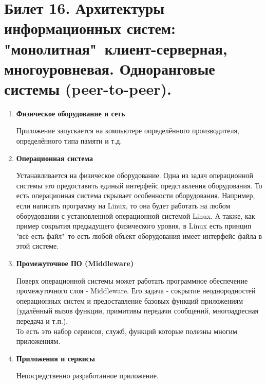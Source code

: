 \newpage
\section{Билет 16. Архитектуры информационных систем: "монолитная"\, клиент-серверная, многоуровневая. Одноранговые системы (peer-to-peer).}

\begin{enumerate}
\setlength\itemsep{0.0001em}
\item \textbf{Физическое оборудование и сеть}

Приложение запускается на компьютере определённого производителя, определённого типа памяти и т.д.

\item \textbf{Операционная система}

Устанавливается на физическое оборудование. Одна из задач операционной системы это предоставить единый интерфейс представления оборудования. То есть операционная система скрывает особенности оборудования. Например, если написать программу на Linux, то она будет работать на любом оборудовании с установленной операционной системой Linux. А также, как пример сокрытия предыдущего физического уровня, в Linux есть принцип "всё есть файл"\, то есть любой объект оборудования имеет интерфейс файла в этой системе. 

\item \textbf{Промежуточное ПО (Middleware)}

Поверх операционной системы может работать программное обеспечение промежуточного слоя - Middleware.
Его задача - сокрытие неоднородностей операционных систем и предоставление базовых функций приложениям (удалённый вызов функции, примитивы передачи сообщений, многоадресная передача и т.п.).\\
То есть это набор сервисов, служб, функций которые полезны многим приложениям.

\item \textbf{Приложения и сервисы}

Непосредственно разработанное приложение.
\end{enumerate}

